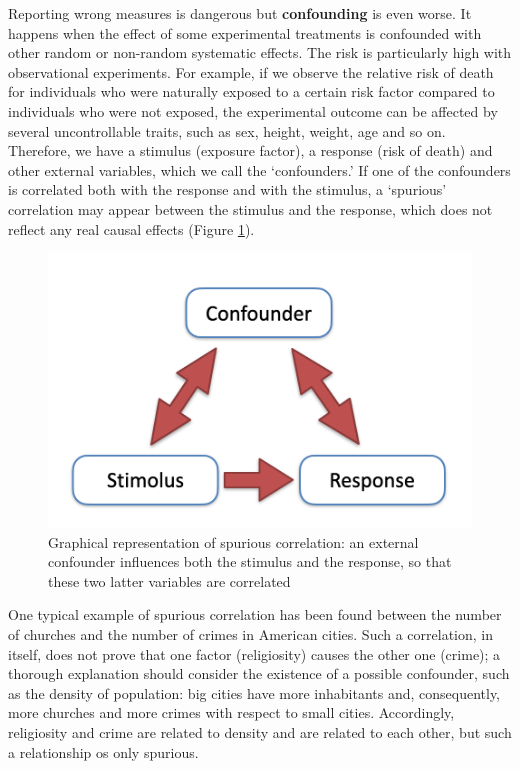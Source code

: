 \documentclass[a4paper,12pt,oneside]{book}
\begin{document}
Reporting wrong measures is dangerous but \textbf{confounding} is even worse. It happens when the effect of some experimental treatments is confounded with other random or non-random systematic effects. The risk is particularly high with observational experiments. For example, if we observe the relative risk of death for individuals who were naturally exposed to a certain risk factor compared to individuals who were not exposed, the experimental outcome can be affected by several uncontrollable traits, such as sex, height, weight, age and so on. Therefore, we have a stimulus (exposure factor), a response (risk of death) and other external variables, which we call the `confounders.' If one of the confounders is correlated both with the response and with the stimulus, a `spurious' correlation may appear between the stimulus and the response, which does not reflect any real causal effects (Figure \ref{fig:figName2d}).

\begin{figure}

{\centering \includegraphics[width=0.75\linewidth]{_images/Confounding} 

}

\caption{Graphical representation of spurious correlation: an external confounder influences both the stimulus and the response, so that these two latter variables are correlated}\label{fig:figName2d}
\end{figure}

One typical example of spurious correlation has been found between the number of churches and the number of crimes in American cities. Such a correlation, in itself, does not prove that one factor (religiosity) causes the other one (crime); a thorough explanation should consider the existence of a possible confounder, such as the density of population: big cities have more inhabitants and, consequently, more churches and more crimes with respect to small cities. Accordingly, religiosity and crime are related to density and are related to each other, but such a relationship os only spurious.
\end{document}
